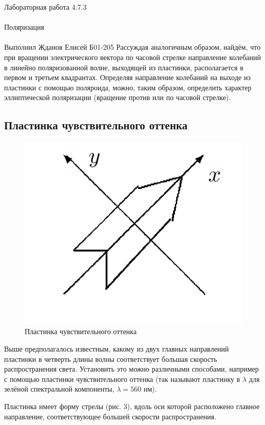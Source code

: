 \documentclass{astroedu-lab}
\begin{document}
\begin{problem}{\huge Лабораторная работа 4.7.3\\\\Поляризация\\\\Выполнил Жданов Елисей Б01-205}
Рассуждая аналогичным образом, найдём, что при вращении электрического вектора по часовой стрелке направление колебаний в линейно поляризованной волне, выходящей из пластинки, располагается в первом и третьем квадрантах. Определяя направление колебаний на выходе из пластинки с помощью поляроида, можно, таким образом, определить характер эллиптической поляризации (вращение против или по часовой стрелке).

\subsection{Пластинка чувствительного оттенка}

\begin{figure}
	\includegraphics[width=\linewidth]{3}
	\caption{Пластинка
чувствительного
оттенка}
	\label{ris 3}
\end{figure}

Выше предполагалось известным, какому из двух главных направлений пластинки в четверть длины волны соответствует большая скорость распространения света.
Установить это можно различными способами, например с помощью
пластинки чувствительного оттенка (так называют пластинку в $ \lambda $
для зелёной спектральной компоненты, $ \lambda = 560 $ нм).

Пластинка имеет форму стрелы (рис. 3), вдоль оси которой расположено главное направление, соответствующее большей скорости распространения.


\end{problem}
\end{document}
